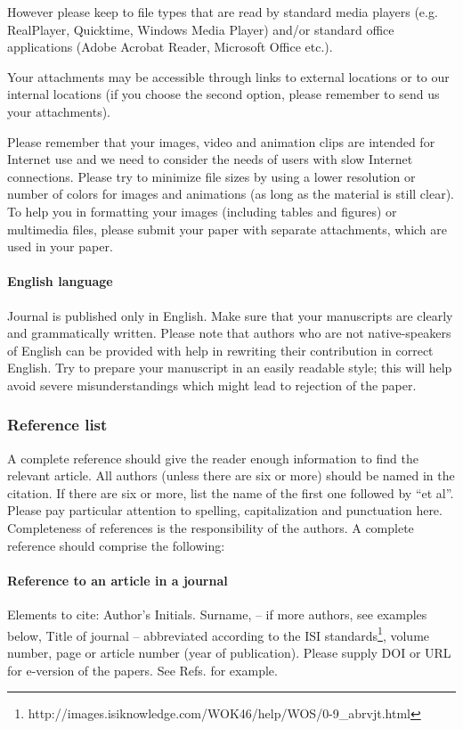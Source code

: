 \documentclass[USenglish,oneside,twocolumn]{article}
\begin{document}
However please keep to file types that are read by standard media players (e.g. RealPlayer, Quicktime, Windows Media Player) and/or standard office applications (Adobe Acrobat Reader, Microsoft Office etc.).

    Your attachments may be accessible through links to external locations or to our internal locations (if you choose the second option, please remember to send us your attachments).

    Please remember that your images, video and animation clips are intended for Internet use and we need to consider the needs of users with slow Internet connections. Please try to minimize file sizes by using a lower resolution or number of colors for images and animations (as long as the material is still clear). To help you in formatting your images (including tables and figures) or multimedia files, please submit your paper with separate attachments, which are used in your paper.

\paragraph{English language}
 Journal     is published only in English. Make sure that your manuscripts are clearly and grammatically written. Please note that authors who are not native-speakers of English can be provided with help in rewriting their contribution in correct English. Try to prepare your manuscript in an easily readable style; this will help avoid severe misunderstandings which might lead to rejection of the paper.

\subsubsection{Reference list}

A complete reference should give the reader enough information to find the relevant article. All authors (unless there are six or more) should be named in the citation. If there are six or more, list the name of the first one followed by ``et al''. Please pay particular attention to spelling, capitalization and punctuation here. Completeness of references is the responsibility of the authors. A complete reference should comprise the following:

\paragraph{Reference to an article in a journal}
Elements to cite:
Author's Initials. Surname, -- if more authors, see examples below,
Title of journal -- abbreviated according to the ISI standards\footnote{ http://images.isiknowledge.com/WOK46/help/WOS/0-9\_abrvjt.html},
volume number, page or article number (year of publication).
Please supply DOI or URL for e-version of the papers.
See Refs. \cite{journal-1, journal-2, journal-3, journal-4, journal-5, journal-6, journal-7, journal-8} for example.
\end{document}
